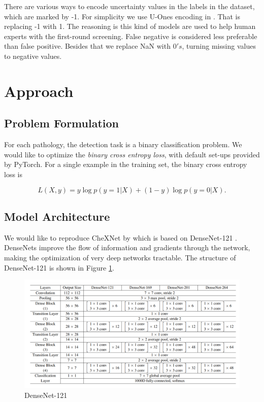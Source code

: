 \documentclass{amia}
\begin{document}
There are various ways to encode uncertainty values in the labels in the dataset, which are marked by -1. For simplicity we use U-Ones encoding in {\color{cyan}\cite{irvin}}. That is replacing -1 with 1. The reasoning is this kind of models are used to help human experts with the first-round screening. False negative is considered less preferable than false positive. Besides that we replace NaN with $0's$, turning missing values to negative values.


\section{Approach}

\subsection{Problem Formulation}
For each pathology, the detection task is a binary classification problem. We would like to optimize the \textit{binary cross entropy loss}, with default set-ups provided by PyTorch. For a single example in the training set, the binary cross entropy loss is

\[L(X, y ) = y\log p(y=1|X)+(1-y)\log p(y=0|X).\]


\subsection{Model Architecture}

We would like to reproduce CheXNet by  {\color{cyan}\cite{rajpurkar}} which is based on DenseNet-121 {\color{cyan}\cite{huang}}. DenseNets improve the flow of information and gradients through the network, making the optimization of very deep networks tractable. The structure of DenseNet-121 is shown in Figure \ref{DenseNet121}.


\begin{figure}[h]
	\centering
	\includegraphics[width=0.8\linewidth]{densenet121.png}
	\caption{DenseNet-121}\label{DenseNet121}
\end{figure}
\end{document}
